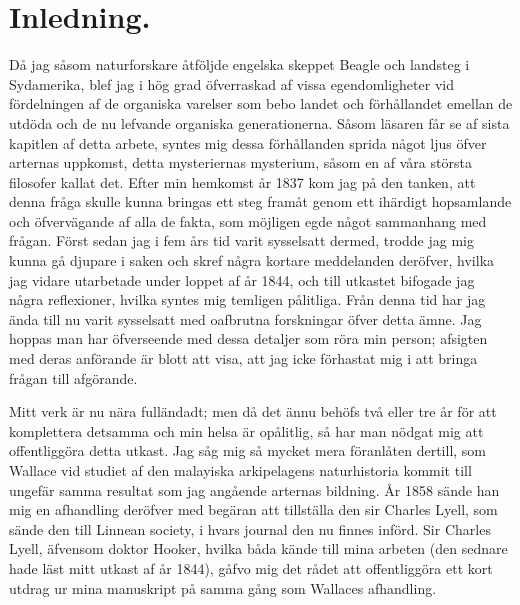 \cleardoublepage
{}
{}
\chapter*{Inledning.} 

Då jag såsom naturforskare åtföljde engelska skeppet Beagle och landsteg i Sydamerika, blef jag i hög grad öfverraskad af vissa egendomligheter vid fördelningen af de organiska varelser som bebo landet och förhållandet emellan de utdöda och de nu lefvande organiska generationerna. Såsom läsaren får se af sista kapitlen af detta arbete, syntes mig dessa förhållanden sprida något ljus öfver arternas uppkomst, detta mysteriernas mysterium, såsom en af våra största filosofer kallat det. Efter min hemkomst år 1837 kom jag på den tanken, att denna fråga skulle kunna bringas ett steg framåt genom ett ihärdigt hopsamlande och öfvervägande af alla de fakta, som möjligen egde något sammanhang med frågan. Först sedan jag i fem års tid varit sysselsatt dermed, trodde jag mig kunna gå djupare i saken och skref några kortare meddelanden deröfver, hvilka jag vidare utarbetade under loppet af år 1844, och till utkastet bifogade jag några reflexioner, hvilka syntes mig temligen pålitliga. Från denna tid har jag ända till nu varit sysselsatt med oafbrutna forskningar öfver detta ämne. Jag hoppas man har öfverseende med dessa detaljer som röra min person; afsigten med deras anförande är blott att visa, att jag icke förhastat mig i att bringa frågan till afgörande.

Mitt verk är nu nära fulländadt; men då det ännu behöfs två eller tre år för att komplettera detsamma och min helsa är opålitlig, så har man nödgat mig att offentliggöra detta utkast. Jag såg mig så mycket mera föranlåten dertill, som Wallace vid studiet af den malayiska arkipelagens naturhistoria kommit till ungefär samma resultat som jag angående arternas bildning. År 1858 sände han mig en afhandling deröfver med begäran att tillställa den sir Charles Lyell, som sände den till Linnean society, i hvars journal den nu finnes införd. Sir Charles Lyell, äfvensom doktor Hooker, hvilka båda kände till mina arbeten (den sednare hade läst mitt utkast af år 1844), gåfvo mig det rådet att offentliggöra ett kort utdrag ur mina manuskript på samma gång som Wallaces afhandling.

